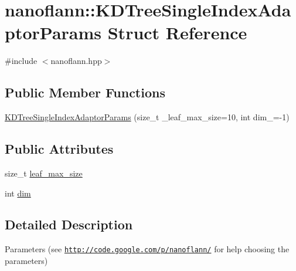 \hypertarget{structnanoflann_1_1_k_d_tree_single_index_adaptor_params}{\section{nanoflann\-:\-:K\-D\-Tree\-Single\-Index\-Adaptor\-Params Struct Reference}
\label{structnanoflann_1_1_k_d_tree_single_index_adaptor_params}
}


{\ttfamily \#include $<$nanoflann.\-hpp$>$}

\subsection*{Public Member Functions}
\begin{DoxyCompactItemize}
\item 
\hyperlink{structnanoflann_1_1_k_d_tree_single_index_adaptor_params_af3679fa09724f1342b86b57d229ed3e2}{K\-D\-Tree\-Single\-Index\-Adaptor\-Params} (size\-\_\-t \-\_\-leaf\-\_\-max\-\_\-size=10, int dim\-\_\-=-\/1)
\end{DoxyCompactItemize}
\subsection*{Public Attributes}
\begin{DoxyCompactItemize}
\item 
size\-\_\-t \hyperlink{structnanoflann_1_1_k_d_tree_single_index_adaptor_params_aa355e5ec6b36fbf75a77aef8b5287fca}{leaf\-\_\-max\-\_\-size}
\item 
int \hyperlink{structnanoflann_1_1_k_d_tree_single_index_adaptor_params_a3fa490f233559594e34b3c1fcb8e5057}{dim}
\end{DoxyCompactItemize}


\subsection{Detailed Description}
Parameters (see \href{http://code.google.com/p/nanoflann/}{\tt http\-://code.\-google.\-com/p/nanoflann/} for help choosing the parameters) 

